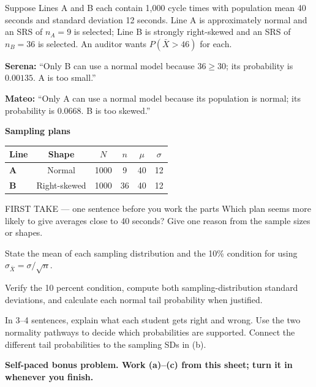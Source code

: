 \documentclass[14pt]{extarticle}
\begin{document}
\pagestyle{empty}


\noindent\begin{minipage}[t]{0.57\linewidth}
\vspace{0pt}
Suppose Lines A and B each contain 1{,}000 cycle times with population mean 40 seconds and standard deviation 12 seconds. Line A is approximately normal and an SRS of $n_A=9$ is selected; Line B is strongly right-skewed and an SRS of $n_B=36$ is selected. An auditor wants $P(\bar X>46)$ for each.\par\smallskip \textbf{Serena:} ``Only B can use a normal model because $36\geq30$; its probability is $0.00135$. A is too small.''\par \textbf{Mateo:} ``Only A can use a normal model because its population is normal; its probability is $0.0668$. B is too skewed.''\par
\end{minipage}\hfill
\begin{minipage}[t]{0.40\linewidth}
\vspace{0pt}
\begin{center}
\textbf{Sampling plans}\par\smallskip
\begin{tabular}{|l|c|c|c|c|c|}
\hline
\textbf{Line} & \textbf{Shape} & \textbf{$N$} & \textbf{$n$} & \textbf{$\mu$} & \textbf{$\sigma$} \\ \hline
\textbf{A} & Normal & 1000 & 9 & 40 & 12 \\ \hline
\textbf{B} & Right-skewed & 1000 & 36 & 40 & 12 \\ \hline
\end{tabular}
\end{center}
\end{minipage}

\begin{firsttakebox}{FIRST TAKE --- one sentence before you work the parts}
Which plan seems more likely to give averages close to 40 seconds? Give one reason from the sample sizes or shapes.
\end{firsttakebox}

\begin{description}[leftmargin=1.15in, labelwidth=1in, itemsep=2pt, topsep=2pt]
  \item[\dokbadge{1}~(a)] State the mean of each sampling distribution and the 10\% condition for using $\sigma_{\bar X}=\sigma/\sqrt n$.
  \item[\dokbadge{2}~(b)] Verify the 10 percent condition, compute both sampling-distribution standard deviations, and calculate each normal tail probability when justified.
  \item[\dokbadge{3}~(c)] In 3--4 sentences, explain what each student gets right and wrong. Use the two normality pathways to decide which probabilities are supported. Connect the different tail probabilities to the sampling SDs in (b).
\end{description}

\vfill
\textbf{Self-paced bonus problem. Work (a)--(c) from this sheet; turn it in whenever you finish.}
\end{document}

